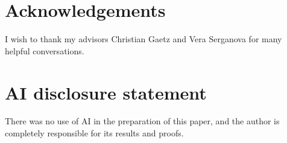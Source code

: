 \documentclass[11pt,a4paper,reqno]{amsart}
\numberwithin{equation}{section}
\theoremstyle{definition}
\theoremstyle{remark}
\begin{document}
\section*{Acknowledgements}
I wish to thank my advisors Christian Gaetz and Vera Serganova for many helpful conversations. 

\section*{AI disclosure statement}
There was no use of AI in the preparation of this paper, and the author is completely responsible for its results and proofs.



\end{document}
